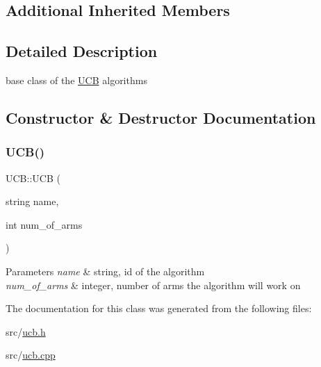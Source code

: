 \subsection*{Additional Inherited Members}


\subsection{Detailed Description}
base class of the \mbox{\hyperlink{class_u_c_b}{U\+CB}} algorithms 

\subsection{Constructor \& Destructor Documentation}
\mbox{\label{class_u_c_b_aa3ac4e46bb3b27fa50a02ea4aaada240}} 
\subsubsection{\texorpdfstring{U\+C\+B()}{UCB()}}
{\footnotesize\ttfamily U\+C\+B\+::\+U\+CB (\begin{DoxyParamCaption}\item[{string}]{name,  }\item[{int}]{num\+\_\+of\+\_\+arms }\end{DoxyParamCaption})}


\begin{DoxyParams}{Parameters}
{\em name} & string, id of the algorithm \\
\hline
{\em num\+\_\+of\+\_\+arms} & integer, number of arms the algorithm will work on \\
\hline
\end{DoxyParams}


The documentation for this class was generated from the following files\+:\begin{DoxyCompactItemize}
\item 
src/\mbox{\hyperlink{ucb_8h}{ucb.\+h}}\item 
src/\mbox{\hyperlink{ucb_8cpp}{ucb.\+cpp}}\end{DoxyCompactItemize}
